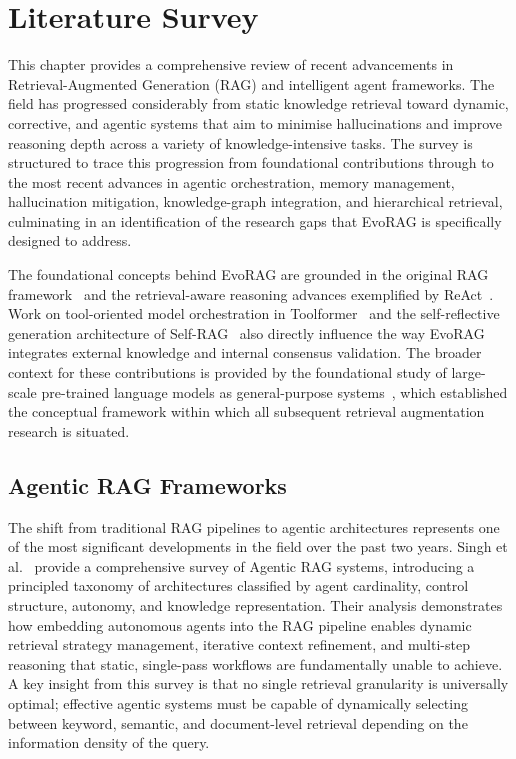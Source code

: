 \chapter{Literature Survey}
\label{chap:literature_review}
 
This chapter provides a comprehensive review of recent advancements in
Retrieval-Augmented Generation (RAG) and intelligent agent frameworks.
The field has progressed considerably from static knowledge retrieval toward dynamic,
corrective, and agentic systems that aim to minimise hallucinations and improve reasoning
depth across a variety of knowledge-intensive tasks.
The survey is structured to trace this progression from foundational contributions
through to the most recent advances in agentic orchestration, memory management,
hallucination mitigation, knowledge-graph integration, and hierarchical retrieval,
culminating in an identification of the research gaps that EvoRAG is specifically
designed to address.

The foundational concepts behind EvoRAG are grounded in the original RAG
framework~\cite{lewis2020rag} and the retrieval-aware reasoning advances exemplified
by ReAct~\cite{yao2022react}.
Work on tool-oriented model orchestration in Toolformer~\cite{schick2023toolformer}
and the self-reflective generation architecture of Self-RAG~\cite{asai2023selfrag}
also directly influence the way EvoRAG integrates external knowledge and internal
consensus validation.
The broader context for these contributions is provided by the foundational study of
large-scale pre-trained language models as general-purpose systems~\cite{bommasani2021foundation},
which established the conceptual framework within which all subsequent retrieval
augmentation research is situated.
 
\section{Agentic RAG Frameworks}
 
The shift from traditional RAG pipelines to agentic architectures represents one of
the most significant developments in the field over the past two years.
Singh et al.~\cite{singh2025agenticrag} provide a comprehensive survey of Agentic RAG
systems, introducing a principled taxonomy of architectures classified by agent
cardinality, control structure, autonomy, and knowledge representation.
Their analysis demonstrates how embedding autonomous agents into the RAG pipeline
enables dynamic retrieval strategy management, iterative context refinement, and
multi-step reasoning that static, single-pass workflows are fundamentally unable to
achieve.
A key insight from this survey is that no single retrieval granularity is universally
optimal; effective agentic systems must be capable of dynamically selecting between
keyword, semantic, and document-level retrieval depending on the information density
of the query.
 
